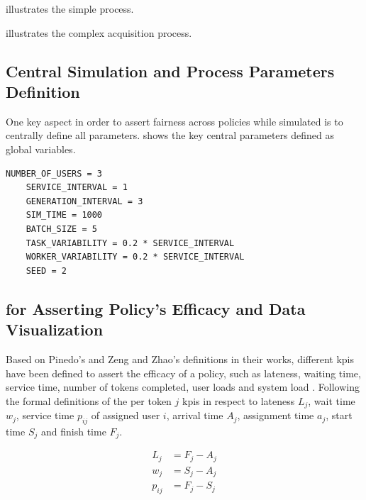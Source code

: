 \documentclass{seal_thesis}
\begin{document}
 illustrates the simple process.


 illustrates the complex acquisition process.


\subsection{Central Simulation and Process Parameters Definition}

One key aspect in order to assert fairness across policies while simulated is to centrally define all parameters.  shows the key central parameters defined as global variables.

\begin{lstlisting}[caption=Central parameters definition that ensures fairness across simulation runs,label=lst:central_parameters,style=CustomPython]
	NUMBER_OF_USERS = 3
	SERVICE_INTERVAL = 1
	GENERATION_INTERVAL = 3
	SIM_TIME = 1000
	BATCH_SIZE = 5
	TASK_VARIABILITY = 0.2 * SERVICE_INTERVAL
	WORKER_VARIABILITY = 0.2 * SERVICE_INTERVAL
	SEED = 2
\end{lstlisting}

\subsection{ for Asserting Policy's Efficacy and Data Visualization}

Based on Pinedo's and Zeng and Zhao's definitions in their works, different \glspl{kpi} have been defined to assert the efficacy of a policy, such as lateness, waiting time, service time, number of tokens completed, user loads and system load \cite{Pinedo2008,Zeng2005}. Following the formal definitions of the per token $j$ \glspl{kpi} in respect to lateness $L_j$, wait time $w_j$, service time $p_{ij}$ of assigned user $i$, arrival time $A_j$, assignment time $a_j$, start time $S_j$ and finish time $F_j$.

\begin{align}
	L_j&=F_j-A_j \label{eq:lateness}\\
	w_j&=S_j-A_j \\
	p_{ij}&=F_j-S_j
\end{align}
\end{document}
